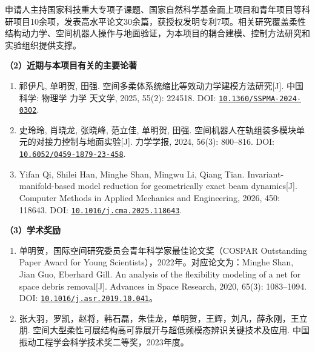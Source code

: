 \documentclass[UTF8,a4paper,zihao=-4,fontset=fandol]{ctexart}
\newcommand{\topic}[1]{\par\Needspace{4\baselineskip}\addvspace{0.5em}\noindent\textbf{#1}\par\nobreak}
\newcommand{\doi}[1]{\href{https://doi.org/#1}{\nolinkurl{#1}}}
\begin{document}
申请人主持国家科技重大专项子课题、国家自然科学基金面上项目和青年项目等科研项目10余项，发表高水平论文30余篇，获授权发明专利7项。相关研究覆盖柔性结构动力学、空间机器人操作与地面验证，为本项目的耦合建模、控制方法研究和实验组织提供支撑。

\topic{（2）近期与本项目有关的主要论著}

\begin{enumerate}[label=\arabic*.]
 \item \begin{minipage}[t]{\linewidth}祁伊凡, 单明贺, 田强. 空间多柔体系统缩比等效动力学建模方法研究[J]. 中国科学: 物理学 力学 天文学, 2025, 55(2): 224518. DOI: \doi{10.1360/SSPMA-2024-0302}.
 \end{minipage}
 \item \begin{minipage}[t]{\linewidth}史玲玲, 肖晓龙, 张晓峰, 范立佳, 单明贺, 田强. 空间机器人在轨组装多模块单元的对接力控制与地面实验[J]. 力学学报, 2024, 56(3): 800--816. DOI: \doi{10.6052/0459-1879-23-458}.
 \end{minipage}
 \item \begin{minipage}[t]{\linewidth}Yifan Qi, Shilei Han, Minghe Shan, Mingwu Li, Qiang Tian. Invariant-manifold-based model reduction for geometrically exact beam dynamics[J]. Computer Methods in Applied Mechanics and Engineering, 2026, 450: 118643. DOI: \doi{10.1016/j.cma.2025.118643}.
 \end{minipage}
\end{enumerate}

\topic{（3）学术奖励}

\begin{enumerate}[label=\arabic*.]
\item 单明贺，国际空间研究委员会青年科学家最佳论文奖（COSPAR Outstanding Paper Award for Young Scientists），2022年。对应论文为：Minghe Shan, Jian Guo, Eberhard Gill. An analysis of the flexibility modeling of a net for space debris removal[J]. Advances in Space Research, 2020, 65(3): 1083--1094. DOI: \doi{10.1016/j.asr.2019.10.041}。
\item 张大羽，罗凯，赵将，韩石磊，朱佳龙，单明贺，王辉，刘凡，薛永刚，王立朋. 空间大型柔性可展结构高可靠展开与超低频模态辨识关键技术及应用. 中国振动工程学会科学技术奖二等奖，2023年度。
\end{enumerate}
\end{document}
